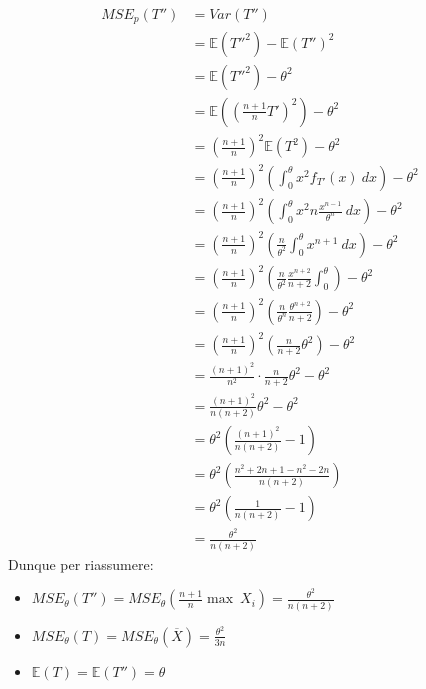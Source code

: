\documentclass[11pt]{report}
\begin{document}
\begin{equation}
    \begin{split}
        MSE_p(T'') & = Var(T'')\\
        & = \mathbb{E} \left( {T''}^2 \right) - \mathbb{E}(T'')^2\\
        & = \mathbb{E} \left( {T''}^2 \right) - \theta^2\\
        & = \mathbb{E} \left( \left( \frac{n+1}{n} T' \right)^2 \right) - \theta^2\\
        & = \left( \frac{n+1}{n} \right)^2 \mathbb{E}(T^2) - \theta^2\\
        & = \left( \frac{n+1}{n} \right)^2 \left( \int_0^\theta x^2 f_{T'}(x)\ dx \right) - \theta^2\\
        & = \left( \frac{n+1}{n} \right)^2 \left( \int_0^\theta x^2 n\frac{x^{n-1}}{\theta^n}\ dx \right) - \theta^2\\
        & = \left( \frac{n+1}{n} \right)^2 \left( \frac{n}{\theta^2} \int_0^\theta x^{n+1}\ dx \right) - \theta^2\\
        & = \left( \frac{n+1}{n} \right)^2 \left( \frac{n}{\theta^2} \frac{x^{n+2}}{n+2} \int_0^\theta \right) - \theta^2\\
        & = \left( \frac{n+1}{n} \right)^2 \left( \frac{n}{\theta^n} \frac{\theta^{n+2}}{n+2} \right) - \theta^2\\
        & = \left( \frac{n+1}{n} \right)^2 \left( \frac{n}{n+2}\theta^2 \right) - \theta^2\\
        & = \frac{(n+1)^2}{n^2} \cdot \frac{n}{n+2}\theta^2 - \theta^2\\
        & = \frac{(n+1)^2}{n(n+2)}\theta^2 - \theta^2\\
        & = \theta^2 \left( \frac{(n+1)^2}{n(n+2)} - 1 \right)\\
        & = \theta^2 \left( \frac{n^2 + 2n + 1 - n^2 - 2n}{n(n+2)} \right)\\
        & = \theta^2 \left( \frac{1}{n(n+2)} - 1 \right)\\
        & = \frac{\theta^2}{n(n+2)}
    \end{split}
\end{equation}
Dunque per riassumere:
\begin{itemize} 
    \item $MSE_\theta(T'') = MSE_\theta \left( \frac{n+1}{n} \max\ X_i \right) = \frac{\theta^2}{n(n+2)}$
    \item $MSE_\theta(T) = MSE_\theta(\overline{X}) = \frac{\theta^2}{3n}$
    \item $\mathbb{E}(T) = \mathbb{E}(T'') = \theta$
\end{itemize}
\end{document}

